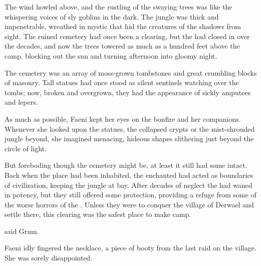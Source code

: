 \begin{comment}
  \section{Jungle}
\end{comment}
\begin{comment}
  \subsection{Bandits haunted}
\end{comment}
The wind howled above, and the rustling of the swaying trees was like the whispering voices of sly goblins in the dark. 
The jungle was thick and impenetrable, wreathed in mystic \wildfog that hid the creatures of the shadows from sight. 
The ruined cemetery had once been a clearing, but the \wylde had closed in over the decades, and now the trees towered as much as a hundred feet above the camp, blocking out the sun and turning afternoon into gloomy night. 

The cemetery was an array of moss-grown tombstones and great crumbling blocks of masonry. 
Tall statues had once stood as silent sentinels watching over the tombs; now, broken and overgrown, they had the appearance of sickly amputees and lepers. 

As much as possible, Faeni kept her eyes on the bonfire and her companions. 
Whenever she looked upon the statues, the collapsed crypts or the mist-shrouded jungle beyond, she imagined menacing, hideous shapes slithering just beyond the circle of light. 


But foreboding though the cemetery might be, at least it still had some \eidola intact. 
Back when the place had been inhabited, the enchanted \eidola had acted as boundaries of civilization, keeping the \wylde jungle at bay. 
After decades of neglect the \eidola had waned in potency, but they still offered some protection, providing a refuge from some of the worse horrors of the \wylde.
Unless they were to conquer the village of Derwael and settle there, this clearing was the safest place to make camp. 

 said Grum.

Faeni idly fingered the necklace, a piece of booty from the last raid on the village. 
She was sorely disappointed. 


